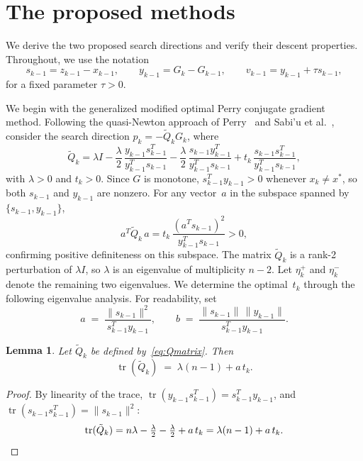 \documentclass{article}
\theoremstyle{plain}
\newtheorem{lemma}{Lemma}
\theoremstyle{definition}
\theoremstyle{remark}
\newcommand{\norm}[1]{\|#1\|}
\DeclareMathOperator{\tr}{tr}
\begin{document}
\section{The proposed methods}\label{sec:methods}

We derive the two proposed search directions and verify their descent properties. Throughout, we use the notation
\begin{equation}\label{eq:notation}
  s_{k-1} = z_{k-1} - x_{k-1}, \qquad
  y_{k-1} = G_k - G_{k-1}, \qquad
  v_{k-1} = y_{k-1} + \tau s_{k-1},
\end{equation}
for a fixed parameter $\tau > 0$.

We begin with the generalized modified optimal Perry conjugate gradient method. Following the quasi-Newton approach of Perry~\cite{perry1978modified} and Sabi'u et al.~\cite{sabi2023modified}, consider the search direction $p_k = -\tilde{Q}_k G_k$, where
\begin{equation}\label{eq:Qmatrix}
  \tilde{Q}_k = \lambda I
    - \frac{\lambda}{2}\,\frac{y_{k-1}s_{k-1}^T}{y_{k-1}^Ts_{k-1}}
    - \frac{\lambda}{2}\,\frac{s_{k-1}y_{k-1}^T}{y_{k-1}^Ts_{k-1}}
    + t_k\,\frac{s_{k-1}s_{k-1}^T}{y_{k-1}^Ts_{k-1}},
\end{equation}
with $\lambda > 0$ and $t_k > 0$. Since $G$ is monotone, $s_{k-1}^T y_{k-1} > 0$ whenever $x_k \neq x^*$, so both $s_{k-1}$ and $y_{k-1}$ are nonzero. For any vector~$a$ in the subspace spanned by $\{s_{k-1}, y_{k-1}\}$,
\[
  a^T \tilde{Q}_k\, a = t_k\,\frac{(a^T s_{k-1})^2}{y_{k-1}^T s_{k-1}} > 0,
\]
confirming positive definiteness on this subspace. The matrix $\tilde{Q}_k$ is a rank-2 perturbation of $\lambda I$, so $\lambda$ is an eigenvalue of multiplicity $n-2$. Let $\eta_k^+$ and $\eta_k^-$ denote the remaining two eigenvalues. We determine the optimal~$t_k$ through the following eigenvalue analysis. For readability, set
\begin{equation}\label{eq:ab}
  a \;=\; \frac{\norm{s_{k-1}}^2}{s_{k-1}^T y_{k-1}}, \qquad
  b \;=\; \frac{\norm{s_{k-1}}\,\norm{y_{k-1}}}{s_{k-1}^T y_{k-1}}.
\end{equation}

\begin{lemma}\label{lem:trace}
Let $\tilde{Q}_k$ be defined by~\eqref{eq:Qmatrix}. Then
\begin{equation}\label{eq:trace}
  \tr(\tilde{Q}_k) \;=\; \lambda(n-1) + a\,t_k.
\end{equation}
\end{lemma}
\begin{proof}
By linearity of the trace, $\tr(y_{k-1}s_{k-1}^T) = s_{k-1}^T y_{k-1}$, and $\tr(s_{k-1}s_{k-1}^T) = \norm{s_{k-1}}^2$:
\[
  \tr(\tilde{Q}_k) = n\lambda - \tfrac{\lambda}{2} - \tfrac{\lambda}{2} + a\,t_k
  = \lambda(n-1) + a\,t_k. \qedhere
\]
\end{proof}
\end{document}
